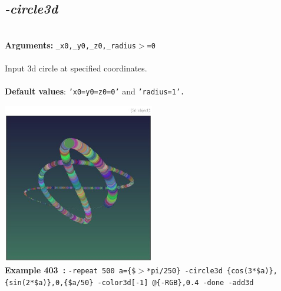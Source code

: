 \documentclass[a4paper,11pt,twoside]{book}
\begin{document}
\subsection{\emph{-circle3d} }\vspace*{-0.5em}
~\\\textbf{Arguments: } 
{\small \texttt{\_x0,\_y0,\_z0,\_radius$>$=0}}\\~\\
Input 3d circle at specified coordinates.
~\\~\\\textbf{Default values}: {\small \texttt{'x0=y0=z0=0'} and \texttt{'radius=1'.}}
\begin{center}\includegraphics[keepaspectratio=true,height=7cm,width=\textwidth]{img/gmic_def403.jpg}\\
{\footnotesize \textbf{Example 403~:} \texttt{-repeat 500 a=\{\$$>$*pi/250\} -circle3d \{cos(3*\$a)\},\{sin(2*\$a)\},0,\{\$a/50\} -color3d[-1] @\{-RGB\},0.4 -done -add3d}}
\end{center}
\end{document}
